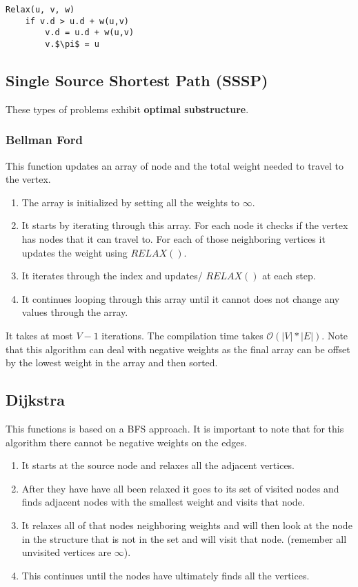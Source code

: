 \begin{lstlisting}[mathescape=true]
    Relax(u, v, w)
    if v.d > u.d + w(u,v)
        v.d = u.d + w(u,v)
        v.$\pi$ = u
\end{lstlisting}


\subsection{Single Source Shortest Path (SSSP)}

These types of problems exhibit \textbf{optimal substructure}. 

\subsubsection{Bellman Ford}

This function updates an array of node and the total weight needed to travel to the vertex.

\begin{enumerate}
    \item The array is initialized by setting all the weights to $\infty$.
    \item It starts by iterating through this array. For each node it checks if the vertex has nodes that it can travel to. For each of those neighboring vertices it updates the weight using $RELAX()$.
    \item It iterates through the index and updates/ $RELAX()$ at each step. 
    \item It continues looping through this array until it cannot does not change any values through the array.
\end{enumerate}

It takes at most $V-1$ iterations. The compilation time takes $\mathcal{O}(|V|*|E|)$.
Note that this algorithm can deal with negative weights as the final array can be offset by the lowest weight in the array and then sorted. 

\subsection{Dijkstra}

This functions is based on a BFS approach. It is important to note that for this algorithm there cannot be negative weights on the edges.

\begin{enumerate}
    \item It starts at the source node and relaxes all the adjacent vertices.
    \item After they have have all been relaxed it goes to its set of visited nodes and finds adjacent nodes with the smallest weight and visits that node.
    \item It relaxes all of that nodes neighboring weights and will then look at the node in the structure that is not in the set and will visit that node. (remember all unvisited vertices are $\infty$).
    \item This continues until the nodes have ultimately finds all the vertices.
\end{enumerate}

